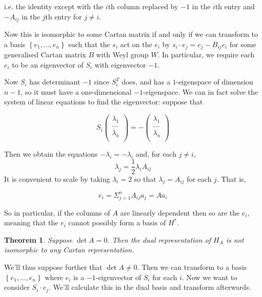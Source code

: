 \documentclass[11pt,a4paper]{report}
\newtheorem{theorem}{Theorem}[chapter]
\theoremstyle{definition}
\begin{document}
i.e. the identity except with the $i$th column replaced by $-1$ in the $i$th entry and $-A_{ij}$ in the $j$th entry for $j \neq i$.

Now this is isomorphic to some Cartan matrix if and only if we can transform to a basis $\left\{e_1, \ldots, e_n\right\}$ such that the $s_i$ act on the $e_i$ by $s_i \cdot e_j = e_j - B_{ij} e_i$ for some generalised Cartan matrix $B$ with Weyl group $W$. In particular, we require each $e_i$ to be an eigenvector of $S_i$ with eigenvector $-1$.

Now $S_i$ has determinant $-1$ since $S_i^T$ does, and has a $1$-eigenspace of dimension $n-1$, so it must have a one-dimensional $-1$-eigenspace. We can in fact solve the system of linear equations to find the eigenvector: suppose that

\begin{equation*}S_i \begin{pmatrix}\lambda_1 \\ \ldots\\ \lambda_n\\\end{pmatrix} = -\begin{pmatrix}\lambda_1 \\ \ldots\\ \lambda_n\\\end{pmatrix}  \end{equation*}

Then we obtain the equations $- \lambda_i = - \lambda_i$ and, for each $j \neq i$, \begin{equation*}\lambda_j = \dfrac{1}{2} \lambda_i A_{ij}\end{equation*} It is convenient to scale by taking $\lambda_i = 2$ so that $\lambda_j = A_{ij}$ for each $j$. That is,

\begin{equation*}e_i = \Sigma_{j=1}^n A_{ij} a_j = A a_i\end{equation*}

So in particular, if the columns of $A$ are linearly dependent then so are the $e_i$, meaning that the $e_i$ cannot possibly form a basis of $H^*$.

\begin{theorem}\label{thm:det0notisomorph} Suppose $\det A = 0$. Then the dual representation of $H_A$ is not isomorphic to any Cartan representation. \end{theorem}

We'll thus suppose further that $\det A \neq 0$. Then we can transform to a basis $\left\{e_1, \ldots, e_n\right\}$ where $e_i$ is a $-1$-eigenvector of $S_i$ for each $i$. Now we want to consider $S_i \cdot e_j$. We'll calculate this in the dual basis and transform afterwards.
\end{document}
